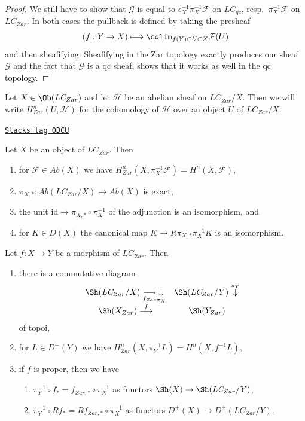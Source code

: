 \begin{proof}
\medskip\noindent
We still have to show that $\mathcal{G}$ is equal to
$\epsilon_X^{-1}\pi_X^{-1}\mathcal{F}$ on $\textit{LC}_{qc}$,
resp.\ $\pi_X^{-1}\mathcal{F}$ on $\textit{LC}_{Zar}$.
In both cases the pullback is defined by taking the presheaf
$$
(f : Y \to X)
\longmapsto
\colim_{f(Y) \subset U \subset X} \mathcal{F}(U)
$$
and then sheafifying. Sheafifying in the Zar topology
exactly produces our sheaf $\mathcal{G}$ and the fact
that $\mathcal{G}$ is a qc sheaf, shows that it works as well
in the qc topology.
\end{proof}

Let $X \in \Ob(\textit{LC}_{Zar})$ and let $\mathcal{H}$
be an abelian sheaf on $\textit{LC}_{Zar}/X$.
Then we will write $H^n_{Zar}(U, \mathcal{H})$ for the cohomology
of $\mathcal{H}$ over an object $U$ of $\textit{LC}_{Zar}/X$.

\begin{lemma}
\label{sites-cohomology-lemma-collect-true-things-Zar}
\href{https://stacks.math.columbia.edu/tag/0DCU}{\texttt{Stacks tag 0DCU}}

Let $X$ be an object of $\textit{LC}_{Zar}$. Then
\begin{enumerate}
\item for $\mathcal{F} \in \textit{Ab}(X)$ we have
$H^n_{Zar}(X, \pi_X^{-1}\mathcal{F}) = H^n(X, \mathcal{F})$,
\item $\pi_{X, *} : \textit{Ab}(\textit{LC}_{Zar}/X) \to \textit{Ab}(X)$
is exact,
\item the unit $\text{id} \to \pi_{X, *} \circ \pi_X^{-1}$
of the adjunction is an isomorphism, and
\item for $K \in D(X)$ the canonical map
$K \to R\pi_{X, *} \pi_X^{-1}K$ is an isomorphism.
\end{enumerate}
Let $f : X \to Y$ be a morphism of $\textit{LC}_{Zar}$. Then
\begin{enumerate}
\item[(5)] there is a commutative diagram
$$
\begin{array}{cc}\Sh(\textit{LC}_{Zar}/X) \underset{f_{Zar}}{\longrightarrow}\underset{\pi_X}{\downarrow} & \Sh(\textit{LC}_{Zar}/Y) \overset{\pi_Y}{\downarrow} \\ \Sh(X_{Zar}) \overset{f}{\longrightarrow} & \Sh(Y_{Zar})\end{array}
$$
of topoi,
\item[(6)] for $L \in D^+(Y)$ we have
$H^n_{Zar}(X, \pi_Y^{-1}L) = H^n(X, f^{-1}L)$,
\item[(7)] if $f$ is proper, then we have
\begin{enumerate}
\item $\pi_Y^{-1} \circ f_* = f_{Zar, *} \circ \pi_X^{-1}$ as functors
$\Sh(X) \to \Sh(\textit{LC}_{Zar}/Y)$,
\item $\pi_Y^{-1} \circ Rf_* = Rf_{Zar, *} \circ \pi_X^{-1}$ as
functors $D^+(X) \to D^+(\textit{LC}_{Zar}/Y)$.
\end{enumerate}
\end{enumerate}
\end{lemma}


